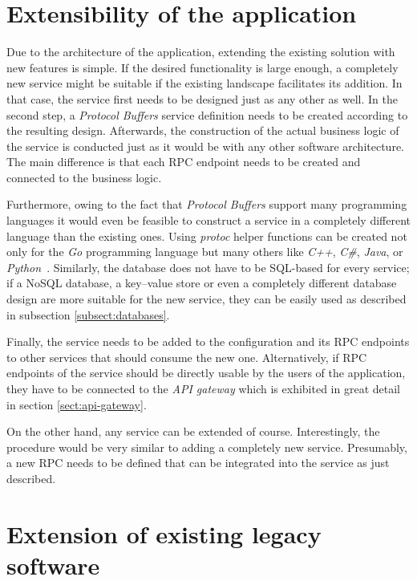 \documentclass[12pt,a4paper,twoside]{report}
\begin{document}
\section{Extensibility of the application}

Due to the architecture of the application, extending the existing solution
with new features is simple.
If the desired functionality is large enough, a completely new service might
be suitable if the existing landscape facilitates its addition.
In that case, the service first needs to be designed just as any other as well.
In the second step, a \textit{Protocol Buffers} service definition needs to be
created according to the resulting design.
Afterwards, the construction of the actual business logic of the service is
conducted just as it would be with any other software architecture.
The main difference is that each RPC endpoint needs to be created and connected
to the business logic.

Furthermore, owing to the fact that \textit{Protocol Buffers} support many
programming languages it would even be feasible to construct a service in a
completely different language than the existing ones.
Using \textit{protoc} helper functions can be created not only for the
\textit{Go} programming language but many others like \textit{C++}, \textit{C\#},
\textit{Java}, or \textit{Python}~\cite{protobuf}.
Similarly, the database does not have to be SQL-based for every service;
if a NoSQL database, a key–value store or even a completely different
database design are more suitable for the new service, they can be easily
used as described in subsection \ref{subsect:databases}.

Finally, the service needs to be added to the configuration and its RPC endpoints
to other services that should consume the new one.
Alternatively, if RPC endpoints of the service should be directly usable
by the users of the application, they have to be connected to the
\textit{API gateway} which is exhibited in great detail in section \ref{sect:api-gateway}.

On the other hand, any service can be extended of course.
Interestingly, the procedure would be very similar to adding a completely new service.
Presumably, a new RPC needs to be defined that can be integrated into the service
as just described.


\section{Extension of existing legacy software}
\end{document}
